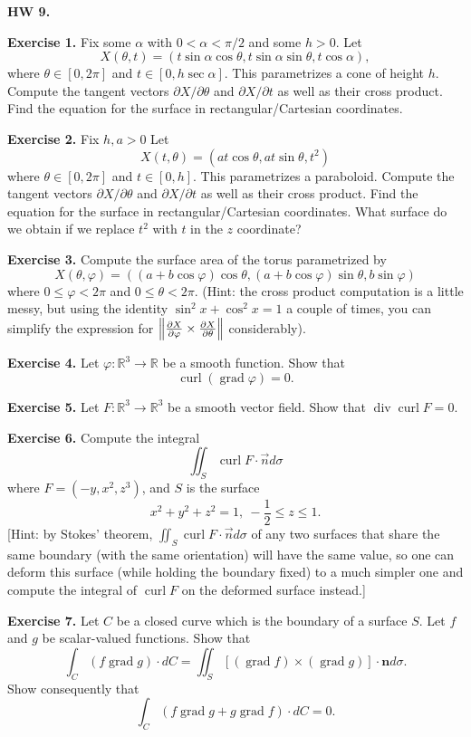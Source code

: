 \documentclass{article}
\DeclareMathOperator{\grd}{grad}
\DeclareMathOperator{\crl}{curl}
\DeclareMathOperator{\dvr}{div}
\begin{document}

\textbf{HW 9.}

\textbf{Exercise 1.} Fix some $\alpha$ with $0 < \alpha < \pi/2$ and some $h>0$. Let 
\[X(\theta,t) = (t\sin \alpha \cos \theta, t \sin \alpha \sin \theta, t \cos \alpha), \]
where $\theta \in [0,2\pi]$ and $t \in [0,h\sec \alpha]$. This parametrizes a cone of height $h$. Compute the
tangent vectors $\partial X / \partial \theta$ and $\partial X/ \partial t$ as well as their cross product.
Find the equation for the surface in rectangular/Cartesian coordinates. 

\textbf{Exercise 2.} Fix $h, a >0$ Let 
\[X(t,\theta) = (a t \cos \theta, a t \sin \theta, t^2)\]
where $\theta \in [0,2\pi]$ and $t \in [0,h]$. This parametrizes a paraboloid. Compute the
tangent vectors $\partial X / \partial \theta$ and $\partial X/ \partial t$ as well as their cross product.
Find the equation for the surface in rectangular/Cartesian coordinates. What surface do we obtain if we replace
$t^2$ with $t$ in the $z$ coordinate?

\textbf{Exercise 3.} Compute the surface area of the torus parametrized by 
\[X(\theta, \varphi) = \left((a+b\cos \varphi)\cos\theta, (a+b\cos\varphi)\sin\theta, b \sin \varphi\right)\]
where $0 \leq \varphi < 2\pi$ and $0 \leq \theta < 2\pi$. (Hint: the cross product computation is a little messy,
but using the identity $\sin^2 x + \cos^2 x = 1$ a couple of times, you can simplify the expression for $\norm{\frac{\partial X}{\partial \varphi} \times \frac{\partial X}{\partial \theta}}$ 
considerably).

\textbf{Exercise 4.} Let $\varphi: \mathbb{R}^3 \to \mathbb{R}$ be a smooth function. Show that
\[ \crl (\grd \varphi) = 0. \]

\textbf{Exercise 5.} Let $F: \mathbb{R}^3 \to \mathbb{R}^3$ be a smooth vector field. Show that $\dvr \crl F = 0$.

\textbf{Exercise 6.} Compute the integral 
\[\iint_S \crl F \cdot \vec{n} d\sigma\]
where $F = (-y,x^2,z^3)$, and $S$ is the surface
\[x^2 + y^2 + z^2 = 1,\ -\frac{1}{2} \leq z \leq 1.\]
[Hint: by Stokes' theorem, $\iint_S \crl F \cdot \vec{n} d\sigma$ of any two surfaces that share the same boundary (with the same orientation) will have the same
value, so one can deform this surface (while holding the boundary fixed) to a much simpler one and compute the integral of $\crl F$ on the deformed surface instead.]

\textbf{Exercise 7.} Let $C$ be a closed curve which is the 
boundary of a surface $S$. Let $f$ and $g$ be scalar-valued functions. Show that
\[\int_C (f \grd g) \cdot dC = \iint_S [(\grd f) \times (\grd g)]\cdot \mathbf{n} d \sigma.\]
Show consequently that 
\[\int_C (f \grd g + g \grd f)\cdot dC = 0.\]
\end{document}
